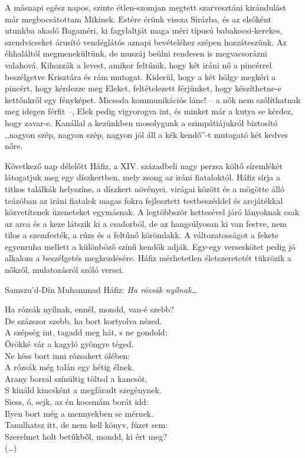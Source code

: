 A másnapi egész napos, szinte étlen-szomjan megtett szarvesztáni
kirándulást már megbocsátottam Mikinek. Estére érünk vissza Sirázba,
és az elsőként utunkba akadó Bagaméri, ki fagylaltját maga méri
típusú babakocsi-kerekes, szendvicseket árusító vendéglátós aznapi
bevételéhez szépen hozzáteszünk. Az éhhaláltól megmenekültünk, de
muszáj beülni rendesen is megvacsorázni valahová. Kihozzák a levest,
amikor feltűnik, hogy két iráni nő a pincérrel beszélgetve Krisztára
és rám mutogat. Kiderül, hogy a két hölgy megkéri a pincért, hogy
kérdezze meg Eleket, feltételezett férjünket, hogy készíthetne-e
kettőnkről egy fényképet. Micsoda kommunikációs lánc! -- a nők nem
szólíthatnak meg idegen férfit --, Elek pedig vigyorogva int, és minket
már a kutya se kérdez, hogy zavar-e. Kanállal a kezünkben mosolygunk
a szimpátiájukról biztosító ,,nagyon szép, nagyon szép, nagyon
jól áll a kék kendő''-t mutogató két kedves nőre.


Következő nap délelőtt Háfiz, a XIV. századbeli nagy perzsa költő
síremlékét látogatjuk meg egy díszkertben, mely zsong az iráni fiataloktól.
Háfiz sírja a titkos találkák helyszíne, a díszkert növényei, virágai
között és a mögötte álló teázóban az iráni fiatalok magas fokra
fejlesztett testbeszéddel és arcjátékkal közvetítenek üzeneteket egymásnak.
A legtöbbször kettesével járó lányoknak csak az arca és a keze
látszik ki a csadorból, de az hangsúlyosan ki van festve, nem tilos a
szemfesték, a rúzs és a feltűnő körömlakk. A változatosságot a fekete
egyenruha mellett a különböző színű kendők adják. Egy-egy verseskötet
pedig jó alkalom a beszélgetés megkezdésére. Háfiz mérhetetlen
életszeretetét tükrözik a nőkről, mulatozásról szóló versei.

\bigskip\noindent
{\otherfamily Samszu'd-Dín Muhammad Háfiz: \textit{Ha rózsák nyílnak\dots}}
\bigskip

\begin{LVerse}
Ha rózsák nyílnak, ennél, mondd, van-é szebb?	\\
De százszor szebb, ha bort kortyolva nézed.	\\
A szépség int, tagadd meg hát, s ne gondold:	\\
Örökké vár a kagyló gyöngye téged.		\\
Ne késs bort inni rózsakert ölében:		\\
A rózsák még talán egy hétig élnek.		\\
Arany borral színültig töltsd a kancsót,	\\
S kínáld kincsként a megfáradt szegénynek.	\\
Siess, ó, sejk, az én kocsmám borát idd:	\\
Ilyen bort még a mennyekben se mérnek.		\\
Tanulhatsz itt, de nem kell könyv, füzet sem:	\\
Szerelmet holt betűkből, mondd, ki ért meg?	\\
(\dots)
\end{LVerse}


